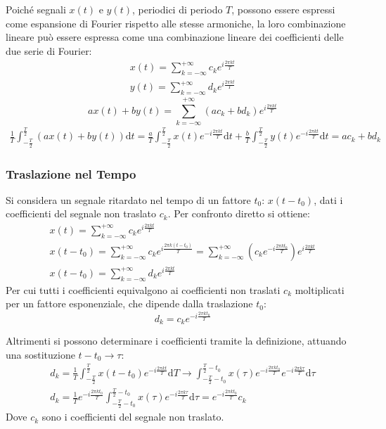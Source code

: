 \documentclass{article}
\newcommand{\df}{\mathrm{d}}
\numberwithin{equation}{subsection}
\begin{document}
Poiché segnali $x(t)$ e $y(t)$, periodici di periodo $T$, possono essere espressi come espansione di Fourier rispetto alle stesse armoniche, la loro combinazione lineare 
può essere espressa come una combinazione lineare dei coefficienti delle due serie di Fourier:
\begin{gather*}
    x(t)=\displaystyle\sum_{k=-\infty}^{+\infty}c_ke^{i\frac{2\pi  k t}{T}}\\    
    y(t)=\displaystyle\sum_{k=-\infty}^{+\infty}d_ke^{i\frac{2\pi  k t}{T}}
\end{gather*}
\begin{equation}
    ax(t)+by(t)=\displaystyle\sum_{k=-\infty}^{+\infty}(ac_k+bd_k)e^{i\frac{2\pi  k t}{T}}
\end{equation}
\begin{gather*}
    \displaystyle\frac{1}{T}\int_{-\frac{T}{2}}^{\frac{T}{2}}(ax(t)+by(t))\df t=\frac{a}{T}\int_{-\frac{T}{2}}^{\frac{T}{2}}x(t)e^{-i\frac{2\pi  k t}{T}}\df t
    +\frac{b}{T}\int_{-\frac{T}{2}}^{\frac{T}{2}}y(t)e^{-i\frac{2\pi  k t}{T}}\df t=ac_k+bd_k
\end{gather*}

\subsubsection{Traslazione nel Tempo}

Si considera un segnale ritardato nel tempo di un fattore $t_0$: $x(t-t_0)$, dati i coefficienti del segnale non traslato $c_k$. Per confronto diretto si ottiene:
\begin{gather*}
    x(t)=\displaystyle\sum_{k=-\infty}^{+\infty}c_ke^{i\frac{2\pi kt}{T}}\\
    x(t-t_0)=\displaystyle\sum_{k=-\infty}^{+\infty}c_ke^{i\frac{2\pi k(t-t_0)}{T}}=\sum_{k=-\infty}^{+\infty}\left(c_ke^{-i\frac{2\pi kt_0}{T}}\right)e^{i\frac{2\pi kt}{T}}\\
    x(t-t_0)=\displaystyle\sum_{k=-\infty}^{+\infty}d_ke^{i\frac{2\pi kt}{T}}
\end{gather*}
Per cui tutti i coefficienti equivalgono ai coefficienti non traslati $c_k$ moltiplicati per un fattore esponenziale, che dipende dalla traslazione $t_0$:
\begin{equation}
    \displaystyle d_k=c_ke^{-i\frac{2\pi kt_0}{T}}
\end{equation}

Altrimenti si possono determinare i coefficienti tramite la definizione, attuando una sostituzione $t-t_0\to\tau$:
\begin{gather*}
    d_k=\displaystyle\frac{1}{T}\int_{-\frac{T}{2}}^{\frac{T}{2}}x(t-t_0)e^{-i\frac{2\pi kt}{T}}\df T\to\int_{-\frac{T}{2}-t_0}^{\frac{T}{2}-t_0}x(\tau)e^{-i\frac{2\pi kt_0}{T}}e^{-i\frac{2\pi k\tau}{T}}\df\tau\\
    d_k=\displaystyle\frac{1}{T}e^{-i\frac{2\pi kt_0}{T}}\int_{-\frac{T}{2}-t_0}^{\frac{T}{2}-t_0}x(\tau)e^{-i\frac{2\pi k\tau}{T}}\df\tau=e^{-i\frac{2\pi kt_0}{T}}c_k
\end{gather*}
Dove $c_k$ sono i coefficienti del segnale non traslato. 
\end{document}
